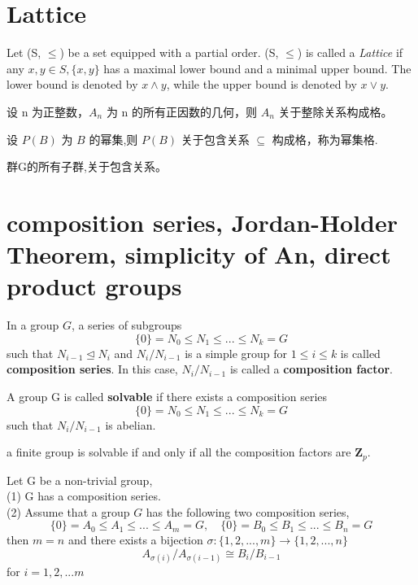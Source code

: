 \documentclass[11pt,fleqn]{book} %
\begin{document}
\begin{CJK}{UTF8}{gkai}
\section{Lattice}
\begin{definition}
	Let (S, $\leq$) be a set equipped with a partial order. (S, $\leq$) is called a {\it Lattice} if any $x, y \in S, \{x, y\}$ has a maximal lower bound and a minimal upper bound.  
	The lower bound is denoted by $x \wedge y$, while the upper bound is denoted by $x \vee y$.
\end{definition}

\begin{example}
	设 n 为正整数，$A_n$ 为 n 的所有正因数的几何，则 $A_n$ 关于整除关系构成格。
\end{example}
\begin{example}
	设 $P(B)$ 为 $B$ 的幂集,则 $P(B)$ 关于包含关系 $\subseteq$ 构成格，称为幂集格.
\end{example}

\begin{example}
	[子群格] 群G的所有子群,关于包含关系。
\end{example}

\section{composition series, Jordan-Holder Theorem, simplicity of An, direct product groups}
\begin{definition}
	 In a group $G$, a series of subgroups 
	\[\{0\} = N_0 \leq N_1 \leq ... \leq N_k = G\]	
	such that $N_{i-1} \unlhd N_i$ and $N_i / N_{i-1}$ is a simple group for $1 \leq i \leq k$ is called {\bf composition series}. In this case, $N_i / N_{i-1}$ is called a {\bf composition factor}.
\end{definition}

\begin{definition}
	[solvable] A group G is called {\bf solvable} if there exists a composition series 
	\[\{0\} = N_0 \leq N_1 \leq ... \leq N_k = G\] 
	such that $N_i / N_{i-1}$ is abelian.
\end{definition}

\begin{corollary}
	a finite group is solvable if and only if all the composition factors are $\mathbf{Z}_p$.
\end{corollary}

\begin{theorem}
	 Let G be a non-trivial group, \\ 
	(1) G has a composition series. \\(2) Assume that a group $G$ has the following two composition series, 
	\[\{0\} = A_0 \leq A_1 \leq ... \leq A_m = G, \quad \{0\} = B_0 \leq B_1 \leq ... \leq B_n = G\]
	then $m = n$ and there exists a bijection $\sigma:\{1,2,...,m\}\to \{1,2,...,n\}$
	\[A_{\sigma(i)} / A_{\sigma(i-1)} \cong B_i / B_{i-1}\]
	for $i = 1, 2, ... m$
\end{theorem}


\end{CJK}
\end{document}
